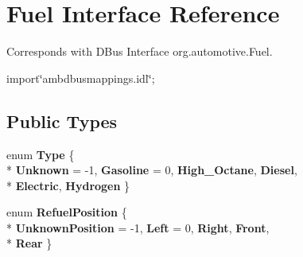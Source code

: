 \hypertarget{interfaceFuel}{\section{Fuel Interface Reference}
\label{interfaceFuel}
}


Corresponds with D\+Bus Interface org.\+automotive.\+Fuel.  




{\ttfamily import\char`\"{}ambdbusmappings.\+idl\char`\"{};}

\subsection*{Public Types}
\begin{DoxyCompactItemize}
\item 
\hypertarget{interfaceFuel_aa25f6bd196dabc3377d117b88232b05c}{enum {\bfseries Type} \{ \\*
{\bfseries Unknown} = -\/1, 
{\bfseries Gasoline} = 0, 
{\bfseries High\+\_\+\+Octane}, 
{\bfseries Diesel}, 
\\*
{\bfseries Electric}, 
{\bfseries Hydrogen}
 \}}\label{interfaceFuel_aa25f6bd196dabc3377d117b88232b05c}

\item 
\hypertarget{interfaceFuel_a8b7d2e461bbd629e082e36d4882fad7b}{enum {\bfseries Refuel\+Position} \{ \\*
{\bfseries Unknown\+Position} = -\/1, 
{\bfseries Left} = 0, 
{\bfseries Right}, 
{\bfseries Front}, 
\\*
{\bfseries Rear}
 \}}\label{interfaceFuel_a8b7d2e461bbd629e082e36d4882fad7b}

\end{DoxyCompactItemize}
